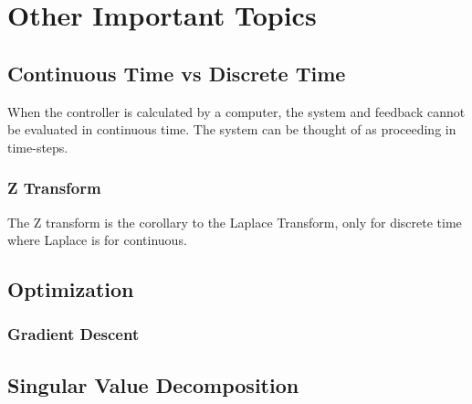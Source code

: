 \documentclass[../notes.tex]{subfiles}
\begin{document}
\section{Other Important Topics}
\subsection{Continuous Time vs Discrete Time}
When the controller is calculated by a computer, the system and feedback cannot be evaluated in continuous time. The system can be thought of as proceeding in time-steps.

\subsubsection{Z Transform}
The Z transform is the corollary to the Laplace Transform, only for discrete time where Laplace is for continuous.

\subsection{Optimization}
\subsubsection{Gradient Descent}

\subsection{Singular Value Decomposition}
\end{document}
